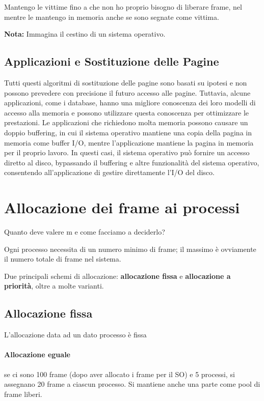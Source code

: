 Mantengo le vittime fino a che non ho proprio bisogno di liberare frame,
nel mentre le mantengo in memoria anche se sono segnate come vittima.

\begin{tcolorbox}
  \textbf{Nota:} Immagina il cestino di un sistema operativo.
\end{tcolorbox}


\subsection{Applicazioni e Sostituzione delle Pagine}

Tutti questi algoritmi di sostituzione delle pagine sono basati su ipotesi e non possono prevedere con precisione il futuro accesso alle pagine. Tuttavia, alcune applicazioni, come i database, hanno una migliore conoscenza dei loro modelli di accesso alla memoria e possono utilizzare questa conoscenza per ottimizzare le prestazioni. Le applicazioni che richiedono molta memoria possono causare un doppio buffering, in cui il sistema operativo mantiene una copia della pagina in memoria come buffer I/O, mentre l'applicazione mantiene la pagina in memoria per il proprio lavoro. In questi casi, il sistema operativo può fornire un accesso diretto al disco, bypassando il buffering e altre funzionalità del sistema operativo, consentendo all'applicazione di gestire direttamente l'I/O del disco.


\section{Allocazione dei frame ai processi}

Quanto deve valere m e come facciamo a deciderlo?

Ogni processo necessita di un numero minimo di frame; il massimo è ovviamente il numero totale di frame nel sistema.

Due principali schemi di allocazione: \textbf{allocazione fissa} e \textbf{allocazione a priorità}, oltre a molte varianti.

\subsection{Allocazione fissa}
L'allocazione data ad un dato processo è fissa


\paragraph{Allocazione eguale} se ci sono 100 frame (dopo aver allocato i frame per il SO) e 5 processi, si assegnano 20 frame a ciascun processo. Si mantiene anche una parte come pool di frame liberi.

